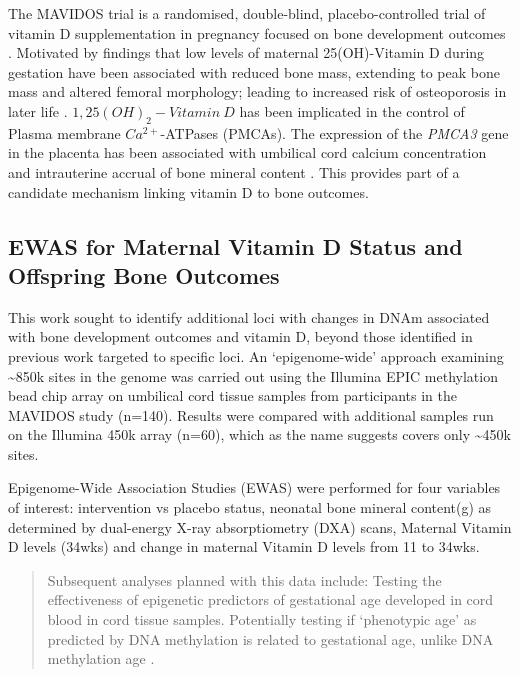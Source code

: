\documentclass[
]{book}
\begin{document}
The MAVIDOS trial is a randomised, double-blind, placebo-controlled trial of vitamin D supplementation in pregnancy focused on bone development outcomes \citep{Harvey2012a, Cooper2016}.
Motivated by findings that low levels of maternal 25(OH)-Vitamin D during gestation have been associated with reduced bone mass, extending to peak bone mass \citep{Zhu2014a} and altered femoral morphology; leading to increased risk of osteoporosis in later life \citep{Mahon2010a, Viljakainen2010, Viljakainen2011}.
\(1,25(OH)_2-Vitamin~D\) has been implicated in the control of Plasma membrane \(Ca^{2+}\)-ATPases (PMCAs).
The expression of the \emph{PMCA3} gene in the placenta has been associated with umbilical cord calcium concentration and intrauterine accrual of bone mineral content \citep{Kip2004}.
This provides part of a candidate mechanism linking vitamin D to bone outcomes.

\hypertarget{ewas-for-maternal-vitamin-d-status-and-offspring-bone-outcomes}{%
\subsection{EWAS for Maternal Vitamin D Status and Offspring Bone Outcomes}\label{ewas-for-maternal-vitamin-d-status-and-offspring-bone-outcomes}}

This work sought to identify additional loci with changes in DNAm associated with bone development outcomes and vitamin D, beyond those identified in previous work targeted to specific loci.
An `epigenome-wide' approach examining \textasciitilde850k sites in the genome was carried out using the Illumina EPIC methylation bead chip array on umbilical cord tissue samples from participants in the MAVIDOS study (n=140).
Results were compared with additional samples run on the Illumina 450k array (n=60), which as the name suggests covers only \textasciitilde450k sites.

Epigenome-Wide Association Studies (EWAS) were performed for four variables of interest: intervention vs placebo status, neonatal bone mineral content(g) as determined by dual-energy X-ray absorptiometry (DXA) scans, Maternal Vitamin D levels (34wks) and change in maternal Vitamin D levels from 11 to 34wks.

\begin{quote}
Subsequent analyses planned with this data include: Testing the effectiveness of epigenetic predictors of gestational age developed in cord blood \citep{Bohlin2016, Knight2016} in cord tissue samples.
Potentially testing if `phenotypic age' as predicted by DNA methylation \citep{Levine2018} is related to gestational age, unlike DNA methylation age \citep{Simpkin2016, Simpkin2017}.
\end{quote}
\end{document}
